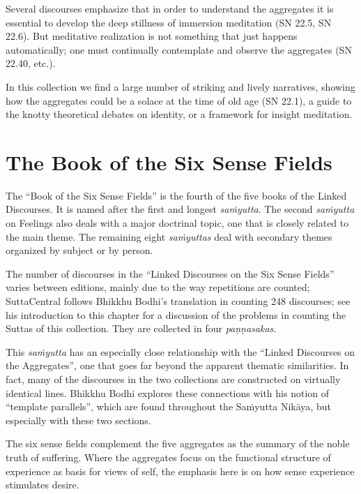 \documentclass[12pt,openany]{book}%
\begin{document}
Several discourses emphasize that in order to understand the aggregates it is essential to develop the deep stillness of immersion meditation (SN 22.5, SN 22.6). But meditative realization is not something that just happens automatically; one must continually contemplate and observe the aggregates (SN 22.40, etc.).

In this collection we find a large number of striking and lively narratives, showing how the aggregates could be a solace at the time of old age (SN 22.1), a guide to the knotty theoretical debates on identity, or a framework for insight meditation.

\section*{The Book of the Six Sense Fields}

The “Book of the Six Sense Fields” is the fourth of the five books of the Linked Discourses. It is named after the first and longest \textit{\textsanskrit{saṁyutta}}. The second \textit{\textsanskrit{saṁyutta}} on Feelings also deals with a major doctrinal topic, one that is closely related to the main theme. The remaining eight \textit{\textsanskrit{saṁyuttas}} deal with secondary themes organized by subject or by person.

The number of discourses in the “Linked Discourses on the Six Sense Fields” varies between editions, mainly due to the way repetitions are counted; SuttaCentral follows Bhikkhu Bodhi’s translation in counting 248 discourses; see his introduction to this chapter for a discussion of the problems in counting the Suttas of this collection. They are collected in four \textit{\textsanskrit{paṇṇasakas}}.

This \textit{\textsanskrit{saṁyutta}} has an especially close relationship with the “Linked Discourses on the Aggregates”, one that goes far beyond the apparent thematic similarities. In fact, many of the discourses in the two collections are constructed on virtually identical lines. Bhikkhu Bodhi explores these connections with his notion of “template parallels”, which are found throughout the \textsanskrit{Saṁyutta} \textsanskrit{Nikāya}, but especially with these two sections.

The six sense fields complement the five aggregates as the summary of the noble truth of suffering. Where the aggregates focus on the functional structure of experience as basis for views of self, the emphasis here is on how sense experience stimulates desire.
\end{document}
